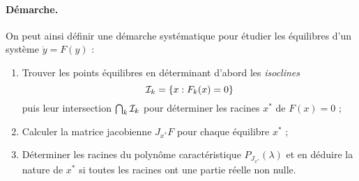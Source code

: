 \paragraph*{Démarche.}
On peut ainsi définir une démarche systématique pour étudier les équilibres d'un système $\dot y = F(y)$ :
\begin{enumerate}
  \item Trouver les points équilibres en déterminant d'abord les {\em isoclines}
  $$
  \mathcal{I}_k = \{x : F_k(x) = 0\}
  $$
  puis leur intersection $\bigcap_k \mathcal{I}_k$ pour déterminer les racines $x^*$ de  $F(x) = 0$ ;
  \item Calculer la matrice jacobienne $J_{x^*} F$ pour chaque équilibre $x^*$ ;
  \item Déterminer les racines du polynôme caractéristique $P_{J_{x^*}}(\lambda)$ et en déduire la nature de $x^*$ si toutes les racines ont une partie réelle non nulle.
\end{enumerate}


